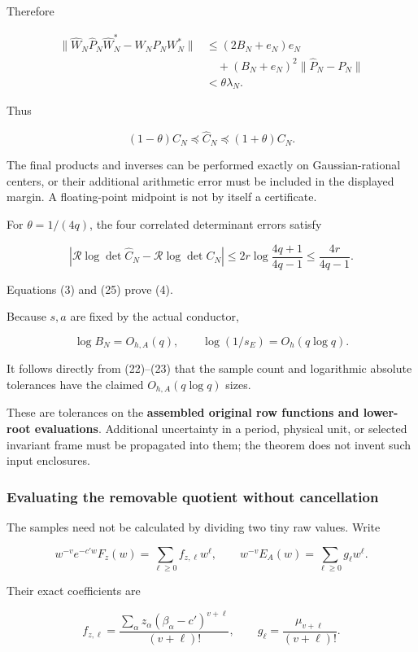 \documentclass[11pt]{article}
\begin{document}
Therefore

\[
\begin{aligned}
\|\widehat W_N\widehat P_N\widehat W_N^*
-W_NP_NW_N^*\|
&\le (2B_N+e_N)e_N\\
&\quad +(B_N+e_N)^2\|\widehat P_N-P_N\|\\
&<\theta\lambda_N.
\end{aligned}
\]

Thus

\[
\boxed{
(1-\theta)C_N
\preceq\widehat C_N
\preceq(1+\theta)C_N.
}
\tag{24}
\]

The final products and inverses can be performed exactly on Gaussian-rational centers, or their additional arithmetic error must be included in the displayed margin. A floating-point midpoint is not by itself a certificate.

For \(\theta=1/(4q)\), the four correlated determinant errors satisfy

\[
\boxed{
|\mathcal R\log\det\widehat C_N
-\mathcal R\log\det C_N|
\le
2r\log\frac{4q+1}{4q-1}
\le\frac{4r}{4q-1}.
}
\tag{25}
\]

Equations (3) and (25) prove (4).

Because \(s,a\) are fixed by the actual conductor,

\[
\log B_N=O_{h,A}(q),
\qquad
\log(1/s_E)=O_h(q\log q).
\]

It follows directly from (22)--(23) that the sample count and logarithmic absolute tolerances have the claimed \(O_{h,A}(q\log q)\) sizes.

These are tolerances on the \textbf{assembled original row functions and lower-root evaluations}. Additional uncertainty in a period, physical unit, or selected invariant frame must be propagated into them; the theorem does not invent such input enclosures.

\subsubsection{Evaluating the removable quotient without cancellation}\label{evaluating-the-removable-quotient-without-cancellation}

The samples need not be calculated by dividing two tiny raw values. Write

\[
w^{-v}e^{-c'w}F_z(w)=\sum_{\ell\ge0}f_{z,\ell}w^\ell,
\qquad
w^{-v}E_A(w)=\sum_{\ell\ge0}g_\ell w^\ell.
\]

Their exact coefficients are

\[
f_{z,\ell}
=
\frac{\sum_\alpha z_\alpha(\beta_\alpha-c')^{v+\ell}}
{(v+\ell)!},
\qquad
g_\ell=\frac{\mu_{v+\ell}}{(v+\ell)!}.
\]
\end{document}
